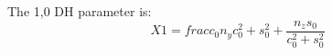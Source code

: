 \documentclass[12pt, letterpaper]{article}
\begin{document}
The 1,0 DH parameter is: 
\[X1 = frac{c_{0} n_{y}}{c_{0}^{2} + s_{0}^{2}} + \frac{n_{z} s_{0}}{c_{0}^{2} + s_{0}^{2}} \]
\end{document}
